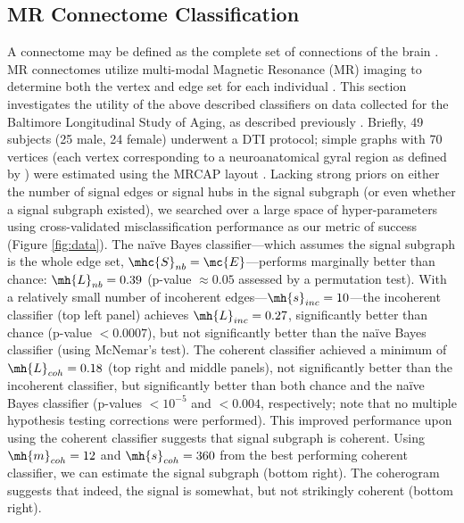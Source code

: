 \documentclass[10pt,journal,cspaper,compsoc]{IEEEtran}
\begin{document}

\subsection{MR Connectome Classification} %
\label{sub:mr_connectome_classification}

A connectome may be defined as the complete set of connections of the brain \cite{Sporns2010}.  MR connectomes utilize multi-modal Magnetic Resonance (MR) imaging to determine both the vertex and edge set for each individual \cite{Hagmann2010}.  This section investigates the utility of the above described classifiers on data collected for the Baltimore Longitudinal Study of Aging, as described previously \cite{OHBM10}.  Briefly, 49 subjects (25 male, 24 female) underwent a DTI protocol; simple graphs with 70 vertices (each vertex corresponding to a neuroanatomical gyral region as defined by \cite{Desikan2006}) were estimated using the MRCAP layout \cite{BMES10}.  Lacking strong priors on either the number of signal edges or signal hubs in the signal subgraph (or even whether a signal subgraph existed), we searched over a large space of hyper-parameters using cross-validated misclassification performance as our metric of success (Figure \ref{fig:data}).  The na\"ive Bayes classifier---which assumes the signal subgraph is the whole edge set, $\mhc{S}_{nb}=\mc{E}$---performs marginally better than chance: $\mh{L}_{nb}=0.39$ (p-value $\approx 0.05$ assessed by a permutation test).  With a relatively small number of incoherent edges---$\mh{s}_{inc}=10$---the incoherent classifier (top left panel) achieves $\mh{L}_{inc}=0.27$, significantly better than chance (p-value $<0.0007$), but not significantly better than the na\"ive Bayes classifier (using McNemar's test).  The coherent classifier achieved a minimum of $\mh{L}_{coh}=0.18$ (top right and middle panels), not significantly better than the incoherent classifier, but significantly better than both chance and the na\"ive Bayes classifier (p-values $<10^{-5}$ and $<0.004$, respectively; note that no multiple hypothesis testing corrections were performed).  This improved performance upon using the coherent classifier suggests that signal subgraph is coherent. Using $\mh{m}_{coh}=12$ and $\mh{s}_{coh}=360$ from the best performing coherent classifier, we can estimate the signal subgraph (bottom right).  The coherogram suggests that indeed, the signal is somewhat, but not strikingly coherent (bottom right).
\end{document}
